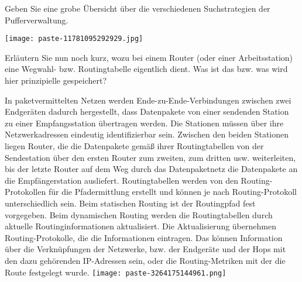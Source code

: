\documentclass{article}
\begin{document}
\begin{tcolorbox}[colback=white!10!white,colframe=lightgray!75!black,
  savelowerto=\jobname_ex.tex,breakable,enhanced,lines before break=40]

\begin{center}
 Geben Sie eine grobe Übersicht über die verschiedenen Suchstrategien der Pufferverwaltung. 

\end{center}

\tcblower

\justifying
\texttt{[image: paste-11781095292929.jpg]}

\end{tcolorbox}
\begin{tcolorbox}[colback=white!10!white,colframe=lightgray!75!black,
  savelowerto=\jobname_ex.tex,breakable,enhanced,lines before break=40]

\begin{center}
 Erläutern Sie nun noch kurz, wozu bei einem Router (oder einer Arbeitsstation) eine Wegwahl- bzw. Routingtabelle eigentlich dient. Was ist das bzw. was wird hier prinzipielle gespeichert? 

\end{center}

\tcblower

\justifying
In paketvermittelten Netzen werden Ende-zu-Ende-Verbindungen zwischen zwei Endgeräten dadurch hergestellt, dass Datenpakete von einer sendenden Station zu einer Empfangsstation übertragen werden. Die Stationen müssen über ihre Netzwerkadressen eindeutig identifizierbar sein. Zwischen den beiden Stationen liegen Router, die die Datenpakete gemäß ihrer Routingtabellen von der Sendestation über den ersten Router zum zweiten, zum dritten usw. weiterleiten, bis der letzte Router auf dem Weg durch das Datenpaketnetz die Datenpakete an die Empfängerstation ausliefert.
Routingtabellen werden von den Routing-Protokollen für die Pfadermittlung erstellt und können je nach Routing-Protokoll unterschiedlich sein. Beim statischen Routing ist der Routingpfad fest vorgegeben. Beim dynamischen Routing werden die Routingtabellen durch aktuelle Routinginformationen aktualisiert. Die Aktualisierung übernehmen Routing-Protokolle, die die Informationen eintragen. Das können Information über die Verknüpfungen der Netzwerke, bzw. der Endgeräte und der Hops mit den dazu gehörenden IP-Adressen sein, oder die Routing-Metriken mit der die Route festgelegt wurde.
\texttt{[image: paste-3264175144961.png]}

\end{tcolorbox}
\end{document}
